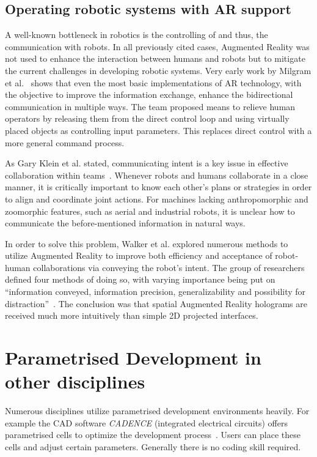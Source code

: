 \subsection{Operating robotic systems with AR support}
A well-known bottleneck in robotics is the controlling of and thus, the communication with robots. In all previously cited cases, Augmented Reality was not used to enhance the interaction between humans and robots but to mitigate the current challenges in developing robotic systems. Very early work by Milgram et al.~\cite{milgram1993applications} shows that even the most basic implementations of AR technology, with the objective to improve the information exchange, enhance the bidirectional communication in multiple ways. The team proposed means to relieve human operators by releasing them from the direct control loop and using virtually placed objects as controlling input parameters. This replaces direct control with a more general command process.

As Gary Klein et al. stated, communicating intent is a key issue in effective collaboration within teams~\cite{klein2005common}. Whenever robots and humans collaborate in a close manner, it is critically important to know each other’s plans or strategies in order to align and coordinate joint actions. For machines lacking anthropomorphic and zoomorphic features, such as aerial and industrial robots, it is unclear how to communicate the before-mentioned information in natural ways.

In order to solve this problem, Walker et al. \cite{walker2018communicating} explored numerous methods to utilize Augmented Reality to improve both efficiency and acceptance of robot-human collaborations via conveying the robot's intent. The group of researchers defined four methods of doing so, with varying importance being put on “information conveyed, information precision, generalizability and possibility for distraction”~\cite{walker2018communicating}. The conclusion was that spatial Augmented Reality holograms are received much more intuitively than simple 2D projected interfaces.

\section{Parametrised Development in other disciplines}
Numerous disciplines utilize parametrised development environments heavily. For example the CAD software \textit{CADENCE} (integrated electrical circuits) offers parametrised cells to optimize the development process~\cite{parametrizedCellElectricalInductor}. Users can place these cells and adjust certain parameters. Generally there is no coding skill required.

